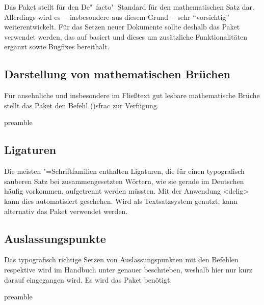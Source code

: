 \documentclass[%
  english,ngerman,%
  cdgeometry=no,DIV=12,%
  cd=false,cdfont=false,cdtitle=true,%
  headings=normal,%
  automark,%
  listof=toc,%
]{tudscrartcl}
\begin{document}
Das Paket  stellt für  den 
De"~facto"~Standard für den mathematischen Satz dar. Allerdings wird es~-- 
insbesondere aus diesem Grund~-- sehr \enquote{vorsichtig} weiterentwickelt. 
Für das Setzen neuer Dokumente sollte deshalb das Paket  
verwendet werden, das auf  basiert und dieses um zusätzliche 
Funktionalitäten ergänzt sowie Bugfixes bereithält.



\subsection{Darstellung von mathematischen Brüchen}

Für ansehnliche und insbesondere im Fließtext gut lesbare mathematische Brüche 
stellt das Paket  den Befehl \Macro(){sfrac} zur 
Verfügung.
%
\begin{Code}{preamble}
\usepackage{xfrac}

\end{Code}



\subsection{Ligaturen}

Die meisten "=Schriftfamilien enthalten Ligaturen, die für 
einen typografisch sauberen Satz bei zusammengesetzten Wörtern, wie sie gerade 
im Deutschen häufig vorkommen, aufgetrennt werden müssten. Mit der Anwendung 
<delig> kann dies automatisiert geschehen. Wird 
 als Textsatzsystem genutzt, kann alternativ das Paket 
 verwendet werden.



\subsection{Auslassungspunkte}

Das typografisch richtige Setzen von Auslassungspunkten mit den Befehlen 
 respektive  wird im Handbuch unter 
 genauer 
beschrieben, weshalb hier nur kurz darauf eingegangen wird. Es wird das Paket 
 benötigt.
%
\begin{Code}{preamble}
\usepackage{ellipsis}
\let\ellipsispunctuation\relax %

\end{Code}
\end{document}
